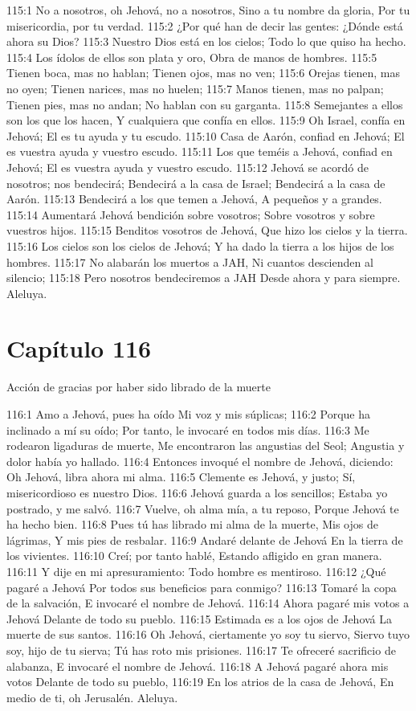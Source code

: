 115:1 No a nosotros, oh Jehová, no a nosotros, 
Sino a tu nombre da gloria, 
Por tu misericordia, por tu verdad. 
115:2 ¿Por qué han de decir las gentes: 
¿Dónde está ahora su Dios? 
115:3 Nuestro Dios está en los cielos; 
Todo lo que quiso ha hecho. 
115:4 Los ídolos de ellos son plata y oro, 
Obra de manos de hombres. 
115:5 Tienen boca, mas no hablan; 
Tienen ojos, mas no ven; 
115:6 Orejas tienen, mas no oyen; 
Tienen narices, mas no huelen; 
115:7 Manos tienen, mas no palpan; 
Tienen pies, mas no andan; 
No hablan con su garganta. 
115:8 Semejantes a ellos son los que los hacen, 
Y cualquiera que confía en ellos. 
115:9 Oh Israel, confía en Jehová; 
El es tu ayuda y tu escudo. 
115:10 Casa de Aarón, confiad en Jehová; 
El es vuestra ayuda y vuestro escudo. 
115:11 Los que teméis a Jehová, confiad en Jehová; 
El es vuestra ayuda y vuestro escudo. 
115:12 Jehová se acordó de nosotros; nos bendecirá; 
Bendecirá a la casa de Israel; 
Bendecirá a la casa de Aarón. 
115:13 Bendecirá a los que temen a Jehová, 
A pequeños y a grandes. 
115:14 Aumentará Jehová bendición sobre vosotros; 
Sobre vosotros y sobre vuestros hijos. 
115:15 Benditos vosotros de Jehová, 
Que hizo los cielos y la tierra. 
115:16 Los cielos son los cielos de Jehová; 
Y ha dado la tierra a los hijos de los hombres. 
115:17 No alabarán los muertos a JAH, 
Ni cuantos descienden al silencio; 
115:18 Pero nosotros bendeciremos a JAH 
Desde ahora y para siempre. 
Aleluya. 
\section*{Capítulo 116}
Acción de gracias por haber sido librado de la muerte 
 
116:1 Amo a Jehová, pues ha oído 
Mi voz y mis súplicas; 
116:2 Porque ha inclinado a mí su oído; 
Por tanto, le invocaré en todos mis días. 
116:3 Me rodearon ligaduras de muerte, 
Me encontraron las angustias del Seol; 
Angustia y dolor había yo hallado. 
116:4 Entonces invoqué el nombre de Jehová, diciendo: 
Oh Jehová, libra ahora mi alma. 
116:5 Clemente es Jehová, y justo; 
Sí, misericordioso es nuestro Dios. 
116:6 Jehová guarda a los sencillos; 
Estaba yo postrado, y me salvó. 
116:7 Vuelve, oh alma mía, a tu reposo, 
Porque Jehová te ha hecho bien. 
116:8 Pues tú has librado mi alma de la muerte, 
Mis ojos de lágrimas, 
Y mis pies de resbalar. 
116:9 Andaré delante de Jehová 
En la tierra de los vivientes. 
116:10 Creí; por tanto hablé, 
Estando afligido en gran manera. 
116:11 Y dije en mi apresuramiento: 
Todo hombre es mentiroso. 
116:12 ¿Qué pagaré a Jehová 
Por todos sus beneficios para conmigo? 
116:13 Tomaré la copa de la salvación, 
E invocaré el nombre de Jehová. 
116:14 Ahora pagaré mis votos a Jehová 
Delante de todo su pueblo. 
116:15 Estimada es a los ojos de Jehová 
La muerte de sus santos. 
116:16 Oh Jehová, ciertamente yo soy tu siervo, 
Siervo tuyo soy, hijo de tu sierva; 
Tú has roto mis prisiones. 
116:17 Te ofreceré sacrificio de alabanza, 
E invocaré el nombre de Jehová. 
116:18 A Jehová pagaré ahora mis votos 
Delante de todo su pueblo, 
116:19 En los atrios de la casa de Jehová, 
En medio de ti, oh Jerusalén. 
Aleluya. 
